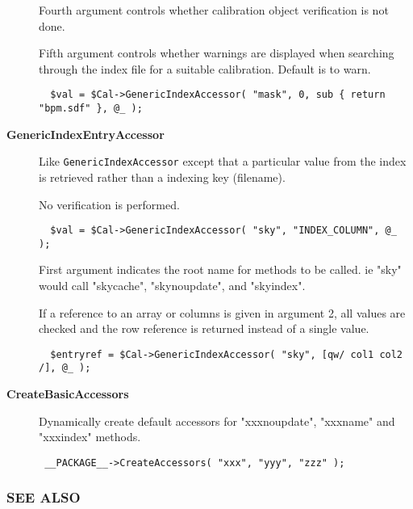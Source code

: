 \begin{description}
Fourth argument controls whether calibration object verification is
not done.



Fifth argument controls whether warnings are displayed when searching
through the index file for a suitable calibration. Default is to warn.

\begin{verbatim}
  $val = $Cal->GenericIndexAccessor( "mask", 0, sub { return "bpm.sdf" }, @_ );
\end{verbatim}

\item[{\textbf{GenericIndexEntryAccessor}}] \mbox{}

Like \texttt{GenericIndexAccessor} except that a particular value from the index
is retrieved rather than a indexing key (filename).



No verification is performed.

\begin{verbatim}
  $val = $Cal->GenericIndexAccessor( "sky", "INDEX_COLUMN", @_ );
\end{verbatim}


First argument indicates the root name for methods to be called. ie "sky" would
call "skycache", "skynoupdate", and "skyindex".



If a reference to an array or columns is given in argument 2, all values
are checked and the row reference is returned instead of a single value.

\begin{verbatim}
  $entryref = $Cal->GenericIndexAccessor( "sky", [qw/ col1 col2 /], @_ );
\end{verbatim}

\item[{\textbf{CreateBasicAccessors}}] \mbox{}

Dynamically create default accessors for "xxxnoupdate", "xxxname" and "xxxindex" methods.

\begin{verbatim}
 __PACKAGE__->CreateAccessors( "xxx", "yyy", "zzz" );
\end{verbatim}
\end{description}
\subsubsection*{SEE ALSO\label{ORAC::Calib_SEE_ALSO}}



